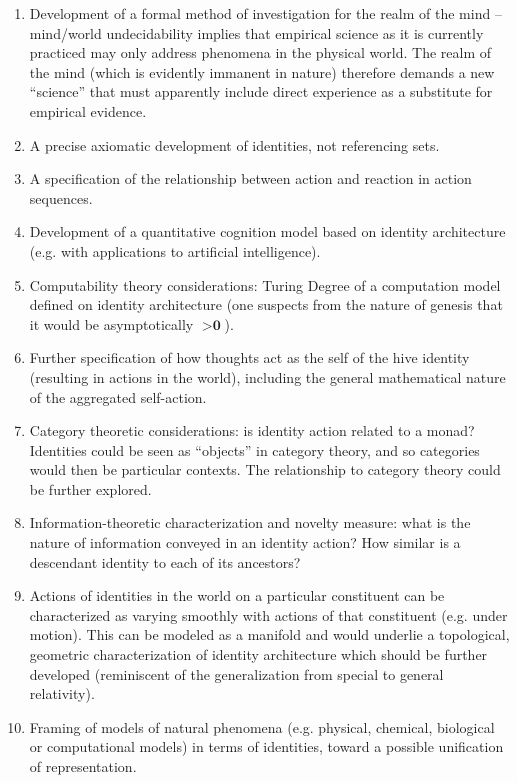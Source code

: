 \documentclass[pra,twocolumn,groupedaddress,10pt]{revtex4}
\theoremstyle{definition}
\begin{document}
\begin{enumerate}
	\item Development of a formal method of investigation for the realm of the mind -- mind/world undecidability implies that empirical science as it is currently practiced may only address phenomena in the physical world. The realm of the mind (which is evidently immanent in nature) therefore demands a new ``science'' that must apparently include direct experience as a substitute for empirical evidence.
	\item A precise axiomatic development of identities, not referencing sets.
	\item A specification of the relationship between action and reaction in action sequences.
	\item Development of a quantitative cognition model based on identity architecture (e.g. with applications to artificial intelligence).
	\item Computability theory considerations: Turing Degree of a computation model defined on identity architecture (one suspects from the nature of genesis that it would be asymptotically $> \textbf{0}$).
	\item Further specification of how thoughts act as the self of the hive identity (resulting in actions in the world), including the general mathematical nature of the aggregated self-action. %
	\item Category theoretic considerations: is identity action related to a monad? Identities could be seen as ``objects'' in category theory, and so categories would then be particular contexts. The relationship to category theory could be further explored.
	\item Information-theoretic characterization and novelty measure: what is the nature of information conveyed in an identity action? How similar is a descendant identity to each of its ancestors?
	\item Actions of identities in the world on a particular constituent can be characterized as varying smoothly with actions of that constituent (e.g. under motion). This can be modeled as a manifold and would underlie a topological, geometric characterization of identity architecture which should be further developed (reminiscent of the generalization from special to general relativity).
	\item Framing of models of natural phenomena (e.g. physical, chemical, biological or computational models) in terms of identities, toward a possible unification of representation.

\end{enumerate}
\end{document}

